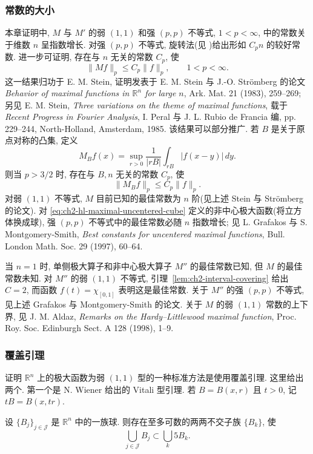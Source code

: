 \subsubsection{常数的大小}
\label{subsec:ch2-size-of-constants}
本章证明中, $M$ 与 $M'$ 的弱 $(1,1)$ 和强 $(p,p)$ 不等式, $1<p<\infty$, 中的常数关于维数 $n$ 呈指数增长. 对强 $(p,p)$ 不等式, 旋转法(见 )给出形如 $C_pn$ 的较好常数. 进一步可证明, 存在与 $n$ 无关的常数 $C_p$, 使
\[
 \|Mf\|_p\le C_p\|f\|_p,\qquad 1<p<\infty.
\]
这一结果归功于 E. M. Stein, 证明发表于 E. M. Stein 与 J.-O. Strömberg 的论文 \emph{Behavior of maximal functions in $\mathbb R^n$ for large $n$}, Ark. Mat. 21 (1983), 259--269; 另见 E. M. Stein, \emph{Three variations on the theme of maximal functions}, 载于 \emph{Recent Progress in Fourier Analysis}, I. Peral 与 J. L. Rubio de Francia 编, pp. 229--244, North-Holland, Amsterdam, 1985. 该结果可以部分推广. 若 $B$ 是关于原点对称的凸集, 定义
\[
 M_Bf(x)=\sup_{r>0}\frac1{|rB|}\int_{rB}|f(x-y)|\,dy.
\]
则当 $p>3/2$ 时, 存在与 $B,n$ 无关的常数 $C_p$, 使
\[
 \|M_Bf\|_p\le C_p\|f\|_p.
\]
对弱 $(1,1)$ 不等式, $M$ 目前已知的最佳常数为 $n$ 阶(见上述 Stein 与 Strömberg 的论文). 对 \eqref{eq:ch2-hl-maximal-uncentered-cube} 定义的非中心极大函数(将立方体换成球), 强 $(p,p)$ 不等式中的最佳常数必随 $n$ 指数增长; 见 L. Grafakos 与 S. Montgomery-Smith, \emph{Best constants for uncentered maximal functions}, Bull. London Math. Soc. 29 (1997), 60--64.

当 $n=1$ 时, 单侧极大算子和非中心极大算子 $M''$ 的最佳常数已知, 但 $M$ 的最佳常数未知. 对 $M''$ 的弱 $(1,1)$ 不等式, 引理~\ref{lem:ch2-interval-covering} 给出 $C=2$, 而函数 $f(t)=\chi_{[0,1]}$ 表明这是最佳常数. 关于 $M''$ 的强 $(p,p)$ 不等式, 见上述 Grafakos 与 Montgomery-Smith 的论文. 关于 $M$ 的弱 $(1,1)$ 常数的上下界, 见 J. M. Aldaz, \emph{Remarks on the Hardy--Littlewood maximal function}, Proc. Roy. Soc. Edinburgh Sect. A 128 (1998), 1--9.

\hypertarget{chapter-02-page-056}{}
\subsubsection{覆盖引理}
\label{subsec:ch2-covering-lemmas}
证明 $\mathbb R^n$ 上的极大函数为弱 $(1,1)$ 型的一种标准方法是使用覆盖引理. 这里给出两个. 第一个是 N. Wiener 给出的 Vitali 型引理. 若 $B=B(x,r)$ 且 $t>0$, 记 $tB=B(x,tr)$.

\begin{Theorem}
\label{thm:ch2-wiener-covering}
设 $\{B_j\}_{j\in\mathcal J}$ 是 $\mathbb R^n$ 中的一族球. 则存在至多可数的两两不交子族 $\{B_k\}$, 使
\[
 \bigcup_{j\in\mathcal J}B_j\subset\bigcup_k5B_k.
\]
\end{Theorem}

